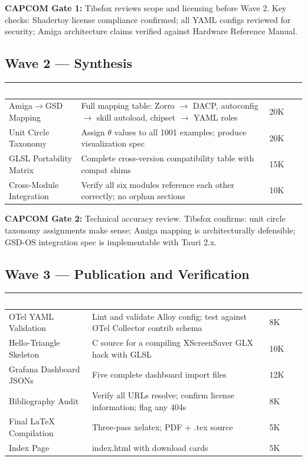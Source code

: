 \documentclass[11pt,letterpaper]{article}
\newcommand{\tableheader}[1]{\textbf{\sffamily\textcolor{white}{#1}}}
\begin{document}
\textbf{CAPCOM Gate 1:} Tibsfox reviews scope and licensing before Wave 2. Key checks: Shadertoy license compliance confirmed; all YAML configs reviewed for security; Amiga architecture claims verified against Hardware Reference Manual.

\subsection{Wave 2 --- Synthesis}

\begin{center}
\begin{tabularx}{\textwidth}{L{4cm}XC{2.5cm}}
\toprule
{}
\tableheader{Task} & \tableheader{Description} & \tableheader{Tokens} \\
\midrule
Amiga$\to$GSD Mapping & Full mapping table: Zorro $\to$ DACP, autoconfig $\to$ skill autoload, chipset $\to$ YAML roles & 20K \\
Unit Circle Taxonomy & Assign $\theta$ values to all 1001 examples; produce visualization spec & 20K \\
GLSL Portability Matrix & Complete cross-version compatibility table with compat shims & 15K \\
Cross-Module Integration & Verify all six modules reference each other correctly; no orphan sections & 10K \\
\bottomrule
\end{tabularx}
\end{center}

\textbf{CAPCOM Gate 2:} Technical accuracy review. Tibsfox confirms: unit circle taxonomy assignments make sense; Amiga mapping is architecturally defensible; GSD-OS integration spec is implementable with Tauri 2.x.

\subsection{Wave 3 --- Publication and Verification}

\begin{center}
\begin{tabularx}{\textwidth}{L{4cm}XC{2.5cm}}
\toprule
{}
\tableheader{Task} & \tableheader{Description} & \tableheader{Tokens} \\
\midrule
OTel YAML Validation & Lint and validate Alloy config; test against OTel Collector contrib schema & 8K \\
Hello-Triangle Skeleton & C source for a compiling XScreenSaver GLX hack with GLSL & 10K \\
Grafana Dashboard JSONs & Five complete dashboard import files & 12K \\
Bibliography Audit & Verify all URLs resolve; confirm license information; flag any 404s & 8K \\
Final LaTeX Compilation & Three-pass xelatex; PDF + .tex source & 5K \\
Index Page & index.html with download cards & 5K \\
\bottomrule
\end{tabularx}
\end{center}
\end{document}
